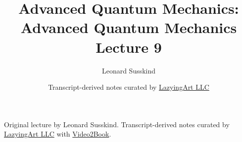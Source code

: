 \documentclass[11pt,oneside]{book}
\begin{document}
\hypersetup{pageanchor=false}
\frontmatter
\title{Advanced Quantum Mechanics: Advanced Quantum Mechanics Lecture 9}
\author{Leonard Susskind}
\date{Transcript-derived notes curated by \href{https://lazying.art}{LazyingArt LLC}}
\maketitle
\begin{center}
\small Original lecture by Leonard Susskind. Transcript-derived notes curated by \href{https://lazying.art}{LazyingArt LLC} with \href{https://github.com/lachlanchen/Video2Book}{Video2Book}.
\end{center}
\clearpage
\hypersetup{pageanchor=true}
\mainmatter

\end{document}
